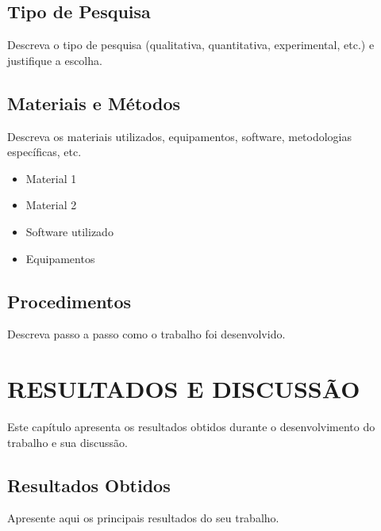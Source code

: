 \documentclass[12pt, a4paper, brazil, oneside]{abntex2}
\begin{document}
\section{Tipo de Pesquisa}

Descreva o tipo de pesquisa (qualitativa, quantitativa, experimental, etc.) e justifique a escolha.

\section{Materiais e Métodos}

Descreva os materiais utilizados, equipamentos, software, metodologias específicas, etc.

\begin{itemize}
    \item Material 1
    \item Material 2  
    \item Software utilizado
    \item Equipamentos
\end{itemize}

\section{Procedimentos}

Descreva passo a passo como o trabalho foi desenvolvido.


\chapter{RESULTADOS E DISCUSSÃO}


Este capítulo apresenta os resultados obtidos durante o desenvolvimento do trabalho e sua discussão.

\section{Resultados Obtidos}

Apresente aqui os principais resultados do seu trabalho.
\end{document}
